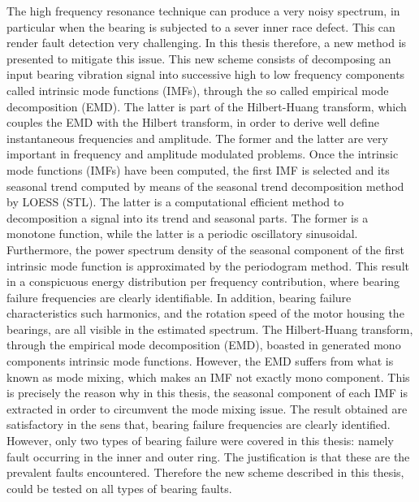 \documentclass[../Main/thesis.tex]{subfiles}
\begin{document}
	\justify
	The high frequency resonance technique can produce a very noisy spectrum, in particular when the bearing is subjected to a sever inner race defect. This can render fault detection very challenging. In this thesis therefore, a new method is presented to mitigate this issue.
	This new scheme consists of decomposing an input bearing vibration signal into successive high to low frequency components called intrinsic mode functions (IMFs), through the so called empirical mode decomposition (EMD). The latter is part of the Hilbert-Huang transform, which couples the EMD with the Hilbert transform, in order to derive well define instantaneous frequencies and amplitude. The former and the latter are very important in frequency and amplitude modulated problems.
	\justify
	Once the intrinsic mode functions (IMFs) have been computed, the first IMF is selected and its seasonal trend computed by means of the seasonal trend decomposition method by LOESS (STL). The latter is a computational efficient method to decomposition a signal into its trend and seasonal parts. The former is a monotone function, while the latter is a periodic oscillatory sinusoidal. Furthermore, the power spectrum density of the seasonal component of the first intrinsic mode function is approximated by the periodogram method. This result in a conspicuous energy distribution per frequency contribution, where bearing failure frequencies are clearly identifiable. In addition, bearing failure characteristics such harmonics, and the rotation speed of the motor housing the bearings, are all visible in the estimated spectrum.
	\justify
	The Hilbert-Huang transform, through the empirical mode decomposition (EMD), boasted in generated mono components intrinsic mode functions. However, the EMD suffers from what is known as mode mixing, which makes an IMF not exactly mono component. This is precisely the reason why in this thesis, the seasonal component of each IMF is extracted in order to circumvent the mode mixing issue.
	\justify
	The result obtained are satisfactory in the sens that, bearing failure frequencies are clearly identified. However, only two types of bearing failure were covered in this thesis: namely fault occurring in the inner and outer ring. The justification is that these are the prevalent faults encountered. Therefore the new scheme described in this thesis, could be tested on all types of bearing faults.

	
\end{document}
